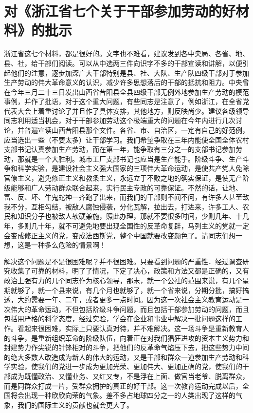 \section[对《浙江省七个关于干部参加劳动的好材料》的批示（一九六三年五月九日）]{对《浙江省七个关于干部参加劳动的好材料》的批示}


浙江省这七个材料，都是很好的。文字也不难看，建议发到各中央局、各省、地、县、社，给干部们阅读。可以从中选两三件向识字不多的干部宣读和讲解，以便引起他们的注意，逐步加深广大干部特别是县、社、大队、生产队四级干部对于参加生产劳动的伟大革命意义的认识，减少许多思想落后的干部的抵抗和阻力。中央曾在今年三月二十三日发出山西省昔阳县全县四级干部无例外地参加生产劳动的模范事例，并作了批语，对于这个重大问题，有些同志是注意了，例如浙江，在全省党代表大会上着重讨论了并且作了具体安排，其他地方，则反映尚少。建议各级领导同志利用适当机会，对于干部参加劳动这个极端重大的问题在今年内进行几次讨论，并普遍宣读山西昔阳县那个文件。各省、市、自治区，一定有自己的好范例，应当选出一些（不要太多）让干部学习。我们希望争取在三年内能使全国全体农村支部书记认真参加生产劳动，而在第一年，能争取有三分之一的支部书记参加劳动，那就是一个大胜利。城市工厂支部书记也应当是生产能手。阶级斗争、生产斗争和科学实验，是建设社会主义强大国家的三项伟大革命运动，是使共产党人免除官僚主义，避免修正主义和教条主义，永远立于不败之地的确实保证，是使无产阶级能够和广人劳动群众联合起来，实行民主专政的可靠保证。不然的话，让地、富、反、坏、牛鬼蛇神一齐跑了出来，而我们的干部则不闻不问，有许多人甚至敌我不分，互相勾结，被敌人腐蚀侵袭，分化瓦解，拉出去，打进来，许多工人、农民和知识分子也被敌人软硬兼施，照此办理，那就不要很多时间，少则几年、十几年，多则几十年，就不可避免地要出现全国性的反革命复辟，马列主义的党就一定会变成修正主义的党，变成法西斯党，整个中国就要改变颜色了。请同志们想一想，这是一种多么危险的情景啊！

解决这个问题是不是很困难呢？并不很困难。只要看到问题的严重性．经过调查研究收集了可靠的材料，明了了情况，下定了决心，政策和方法又都是正确的，又有政治上强有力的几个同志作为核心领导，那末，就一个公社的范围来说，有几个星期就够了，就一个县来说，有几个月也就够了，就一个省来说，分期分批，搞好搞透，大约需要一年、二年，或者更多一点时间。因为这一次社会主义教育运动是一次伟大的革命运动，不但包括阶级斗争问题，而且包括干部参加劳动的问题，而且包括用严格的科学态度，经过实验，学会在企业和事业中解决一批问题这样的工作。看起来很困难，实际上只要认真对待，并不难解决。这一场斗争是重新教育人的斗争，是重新组织革命的阶级队伍，向着正在对我们猖狂进攻的资本主义势力和封建势力作尖锐的针锋相对的斗争，把他们的反革命气焰压下去，把这些势力中间的绝大多数人改造成为新人的伟大的运动，又是干部和群众一道参加生产劳动和科学实验，使我们的党进一步成为更加光荣、更加伟大、更加正确的党，使我们的干部成为既懂政治、又懂业务、又红又专，不是浮在上面、做官当老爷、脱离群众，而是同群众打成一片，受群众拥护的真正的好干部。这一次教育运动完成以后，全国将会出现一种欣欣向荣的气象。差不多占地球四分之一的人类出现了这样的气象，我们的国际主义的贡献也就会更大了。


